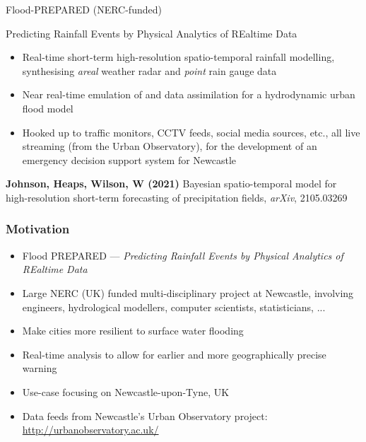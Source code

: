 \begin{frame}{Flood-PREPARED (NERC-funded)}
\protect\hypertarget{flood-prepared-nerc-funded}{}

\begin{block}{Predicting Rainfall Events by Physical Analytics of
REaltime Data}

\begin{itemize}
\tightlist
\item
  Real-time short-term high-resolution spatio-temporal rainfall
  modelling, synthesising \emph{areal} weather radar and \emph{point}
  rain gauge data
\item
  Near real-time emulation of and data assimilation for a hydrodynamic
  urban flood model
\item
  Hooked up to traffic monitors, CCTV feeds, social media sources, etc.,
  all live streaming (from the Urban Observatory), for the development
  of an emergency decision support system for Newcastle
\end{itemize}

\textbf{Johnson, Heaps, Wilson, W (2021)} Bayesian spatio-temporal model
for high-resolution short-term forecasting of precipitation fields,
\emph{arXiv}, 2105.03269

\end{block}

\end{frame}

\begin{frame}[fragile]
\frametitle{Motivation}
\bigskip
\bigskip
\begin{itemize}
\item \alert{Flood PREPARED} --- \emph{Predicting Rainfall Events by Physical Analytics of REaltime Data}
  \item Large NERC (UK) funded multi-disciplinary project at Newcastle, involving engineers, hydrological modellers, computer scientists, statisticians, ... 
\item Make cities more resilient to surface water flooding
\item Real-time analysis to allow for earlier and more geographically precise warning
\item Use-case focusing on Newcastle-upon-Tyne, UK
  \item Data feeds from Newcastle's Urban Observatory project:  \alert{\url{http://urbanobservatory.ac.uk/}}
\end{itemize}
\end{frame}


